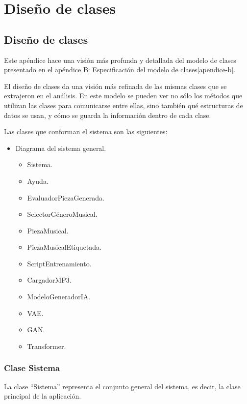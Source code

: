 
\chapter{Diseño de clases}
\label{diseño-clases}
\section{Diseño de clases}

Este apéndice hace una visión más profunda y detallada del modelo de clases presentado en el apéndice B: Especificación del modelo de clases\ref{apendice-b}.

El diseño de clases da una visión más refinada de las mismas clases que se extrajeron en el análisis. En este modelo se pueden ver no sólo los métodos que utilizan las clases para comunicarse entre ellas, sino también qué estructuras de datos se usan, y cómo se guarda la información dentro de cada clase.

Las clases que conforman el sistema son las siguientes:

\begin{itemize}
    \item Diagrama del sistema general.
    \begin{itemize}
        \item Sistema.
        \item Ayuda.
        \item EvaluadorPiezaGenerada.
        \item SelectorGéneroMusical.
        \item PiezaMusical.
        \item PiezaMusicalEtiquetada.
        \item ScriptEntrenamiento.
        \item CargadorMP3.
        \item ModeloGeneradorIA.
        \item VAE.
        \item GAN.
        \item Transformer.
    \end{itemize}
\end{itemize}

\subsection{Clase Sistema}

La clase ``Sistema'' representa el conjunto general del sistema, es decir, la clase principal de la aplicación.

